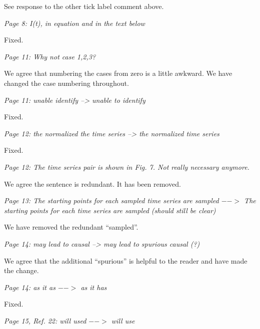\documentclass[a4paper,11pt]{article}
\begin{document}
See response to the other tick label comment above.

\vspace{0.5cm}
{\em Page 8: I(t), in equation and in the text below}
\vspace{0.5cm}

Fixed.

\vspace{0.5cm}
{\em Page 11: Why not case 1,2,3?}
\vspace{0.5cm}

We agree that numbering the cases from zero is a little awkward.  We have changed the case numbering throughout.

\vspace{0.5cm}
{\em Page 11: unable identify --> unable to identify}
\vspace{0.5cm}

Fixed.

\vspace{0.5cm}
{\em Page 12: the normalized the time series --> the normalized time series}
\vspace{0.5cm}

Fixed.

\vspace{0.5cm}
{\em Page 12: The time series pair is shown in Fig. 7. Not really necessary
anymore.}
\vspace{0.5cm}

We agree the sentence is redundant.  It has been removed.

\vspace{0.5cm}
{\em Page 13: The starting points for each sampled time series are sampled
$-->$ The starting points for each time series are sampled (should still
be clear)}
\vspace{0.5cm}

We have removed the redundant ``sampled''.

\vspace{0.5cm}
{\em Page 14: may lead to causal --> may lead to spurious causal (?)}
\vspace{0.5cm}

We agree that the additional ``spurious'' is helpful to the reader and have made the change.

\vspace{0.5cm}
{\em Page 14: as it as $-->$ as it has}
\vspace{0.5cm}

Fixed.

\vspace{0.5cm}
{\em Page 15, Ref. 22: will used $-->$ will use}
\vspace{0.5cm}
\end{document}
